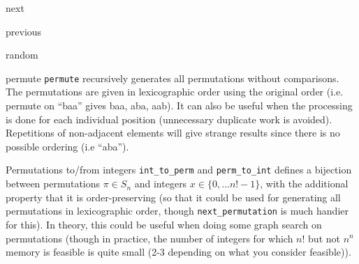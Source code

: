 \begin{algorithm}{next}
\end{algorithm}
\begin{algorithm}{previous}
\end{algorithm}
\begin{algorithm}{random}
\end{algorithm}
\begin{algorithm}{permute}
\desc
{\tt permute} recursively generates all permutations
without comparisons. The permutations are given in lexicographic order
using the original order (i.e. permute on ``baa'' gives baa, aba, aab).
It can also be useful when the processing is done for each individual
position (unnecessary duplicate work is avoided). Repetitions of non-adjacent
elements will give strange results since there is no possible ordering
(i.e ``aba'').
\end{algorithm}
\begin{algorithm}{Permutations to/from integers}
\desc
{\tt int\_to\_perm} and {\tt perm\_to\_int} defines a bijection
between permutations $\pi \in S_n$ and integers $x \in \{0, \ldots
n!-1\}$, with the additional property that it is order-preserving (so
that it could be used for generating all permutations in lexicographic
order, though {\tt next\_permutation} is much handier for this).  In
theory, this could be useful when doing some graph search on
permutations (though in practice, the number of integers for which
$n!$ but not $n^n$ memory is feasible is quite small (2-3 depending on
what you consider feasible)).
\end{algorithm}


\begin{sourceslandscape}

\end{sourceslandscape}
